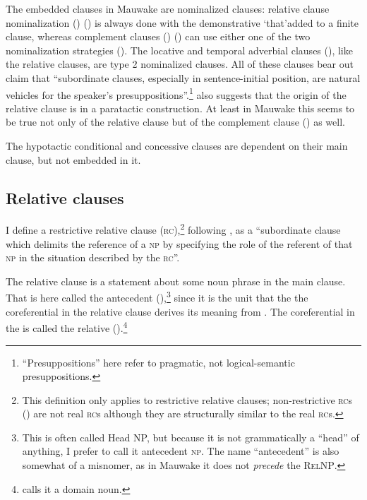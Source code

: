 The embedded clauses in Mauwake are nominalized clauses: relative clause nominalization () () is always done with the demonstrative \textstyleStyleVernacularWordsItalic `that'added to a finite clause, whereas complement clauses () () can use either one of the two nominalization strategies (). The locative and temporal adverbial clauses (), like the relative clauses, are type 2 nominalized clauses. All of these clauses bear out  claim that ``subordinate clauses, especially in sentence-initial position, are natural vehicles for the speaker's presuppositions''.\footnote{``Presuppositions'' here refer to pragmatic, not logical-semantic presuppositions.}  \citet[230]{Reesink1983b} also suggests that the origin of the relative clause is in a paratactic construction. At least in Mauwake this seems to be true not only of the relative clause but of the complement clause () as well. 

The hypotactic conditional and concessive clauses are dependent on their main clause, but not embedded in it. 

\subsection{Relative clauses}  \label{sec:8.3.1}

I define a restrictive relative clause (\textsc{rc}),\footnote{This definition only applies to restrictive relative clauses; non-restrictive \textsc{rc}s () are not real \textsc{rc}s although they are structurally similar to the real \textsc{rc}s.} following \citet[206]{Andrews2007b}, as a ``subordinate clause which delimits the reference of a \textsc{np} by specifying the role of the referent of that \textsc{np} in the situation described by the \textsc{rc}''. 

The relative clause is a statement about some noun phrase in the main clause. That  is here called the antecedent  (),\footnote{This is often called Head NP, but because it is not grammatically a ``head'' of anything, I prefer to call it antecedent \textsc{np}. The name ``antecedent'' is also somewhat of a misnomer, as in Mauwake it does not \textit{precede} the \textsc{RelNP}.}  since it is the unit that the the coreferential  in the relative clause derives its meaning from \citep[20]{Crystal1997}. The coreferential  in the  is called the relative  ().\footnote{\citet[142]{Keenan1985} calls it a domain noun.}


